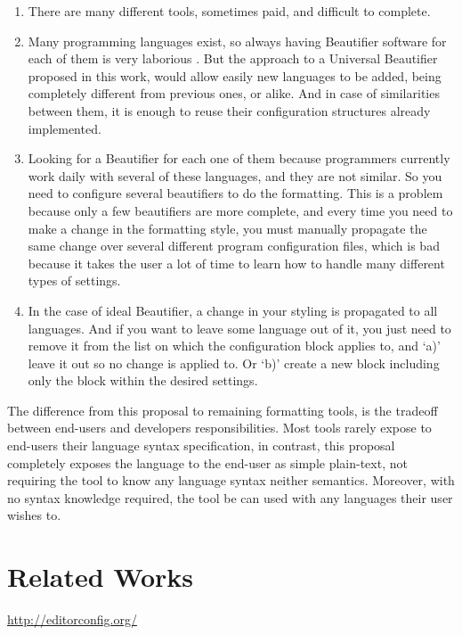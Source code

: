 \begin{enumerate}[leftmargin=*]
    \item There are many different tools, sometimes paid, and difficult to
          complete. \cite{universalCodeFormatter}

    \item Many programming languages exist, so always having Beautifier
          software for each of them is very laborious
          \cite{universalCodeFormatter}. But the approach to a Universal
          Beautifier proposed in this work, would allow easily new languages to be
          added, being completely different from previous ones, or alike. And in
          case of similarities between them, it is enough to reuse their
          configuration structures already implemented.

    \item Looking for a Beautifier for each one of them because programmers
          currently work daily with several of these languages, and they are not
          similar. So you need to configure several beautifiers to do the
          formatting. This is a problem because only a few beautifiers are more
          complete, and every time you need to make a change in the formatting
          style, you must manually propagate the same change over several
          different program configuration files, which is bad because it takes the
          user a lot of time to learn how to handle many different types of
          settings. \cite{Schweitzer}

    \item In the case of ideal Beautifier, a change in your styling is
          propagated to all languages. And if you want to leave some language out
          of it, you just need to remove it from the list on which the
          configuration block applies to, and `a)' leave it out so no change is
          applied to. Or `b)' create a new block including only the block within
          the desired settings.

\end{enumerate}

The difference from this proposal to remaining formatting tools,
is the tradeoff between end\hyp{}users and developers responsibilities.
Most tools rarely expose to end\hyp{}users their language syntax specification,
in contrast,
this proposal completely exposes the language to the end\hyp{}user as simple plain\hyp{}text,
not requiring the tool to know any language syntax neither semantics.
Moreover,
with no syntax knowledge required,
the tool be can used with any languages their user wishes to.



\section{Related Works}


\url{http://editorconfig.org/}

